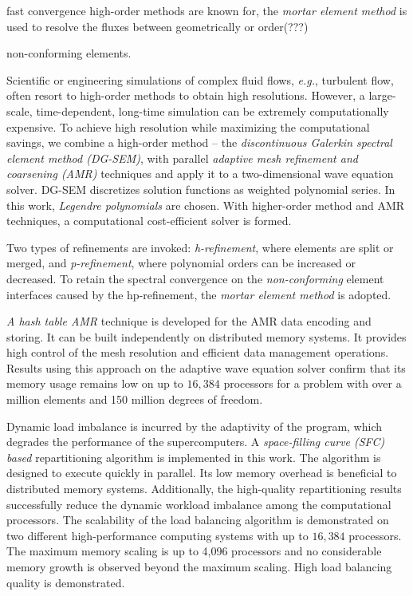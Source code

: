 fast convergence high-order methods are known for, the \textit{mortar element method} is used to resolve the fluxes between geometrically or order(???) 

non-conforming elements.



Scientific or engineering simulations of complex fluid flows, \textit{e.g.}, turbulent flow, often resort to high-order methods to obtain high resolutions. However, a large-scale, time-dependent, long-time simulation can be extremely  computationally expensive. To achieve high resolution while maximizing the computational savings, we combine a high-order method -- the \textit{discontinuous Galerkin spectral element method (DG-SEM)}, with parallel \textit{adaptive mesh refinement and coarsening (AMR)} techniques and apply it to a two-dimensional wave equation solver. DG-SEM discretizes solution functions as weighted polynomial series. In this work, \textit{Legendre polynomials} are chosen. With higher-order method and AMR techniques, a computational cost-efficient solver is formed. 

Two types of refinements are invoked: \textit{h-refinement}, where elements are split or merged, and \textit{p-refinement}, where polynomial orders can be increased or decreased. To retain the spectral convergence on the \textit{non-conforming} element interfaces caused by the hp-refinement, the \textit{mortar element method} is adopted. 

\textit{A hash table AMR} technique is developed for the AMR data encoding and storing. It can be built independently on distributed memory systems. It provides high control of the mesh resolution and efficient data management operations. Results using this approach on the adaptive wave equation solver confirm that its memory usage remains low on up to $16,384$ processors for a problem with over a million elements and 150 million degrees of freedom.

Dynamic load imbalance is incurred by the adaptivity of the program, which degrades the performance of the supercomputers. A \textit{space-filling curve (SFC) based} repartitioning algorithm is implemented in this work. The algorithm is designed to execute quickly in parallel. Its low memory overhead is beneficial to distributed memory systems. Additionally, the high-quality repartitioning results successfully reduce the dynamic workload imbalance among the computational processors. The scalability of the load balancing algorithm is demonstrated on two different high-performance computing systems with up to $16,384$ processors. The maximum memory scaling is up to 4,096 processors and no considerable memory growth is observed beyond the maximum scaling. High load balancing quality is demonstrated. 

